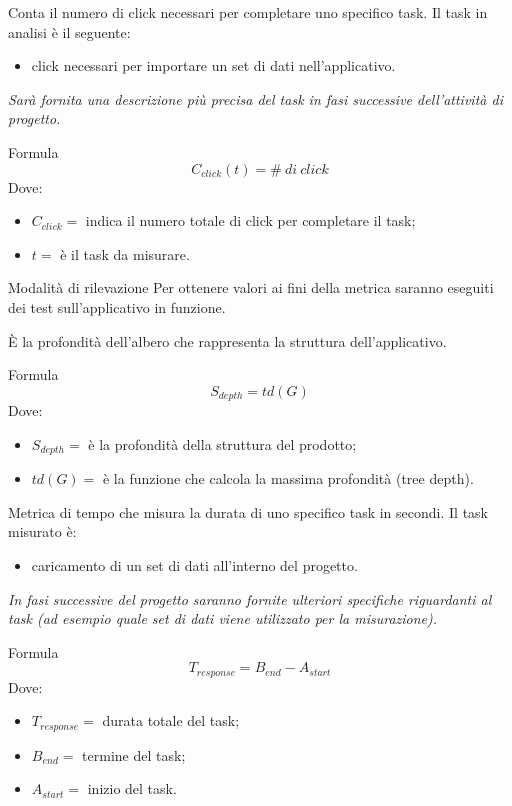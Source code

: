 Conta il numero di click necessari per completare uno specifico task. Il task 
in analisi è il seguente: 
\begin{itemize}
  \item click necessari per importare un set di dati nell'applicativo.
\end{itemize}
\textit{Sarà fornita una descrizione più precisa del task in fasi successive 
dell'attività di progetto.}
\par{Formula}
\begin{displaymath}
  C_{click}(t) = \#\ di\ click
\end{displaymath}
Dove:
\begin{itemize}
  \item[] $C_{click} =$ indica il numero totale di click per completare il 
task; 
  \item[] $t =$ è il task da misurare.
\end{itemize}
\par{Modalità di rilevazione}
Per ottenere valori ai fini della metrica saranno eseguiti dei test 
sull'applicativo in funzione.

È la profondità dell'albero che rappresenta la struttura dell'applicativo.
\par{Formula}
\begin{displaymath}
  S_{depth} = td(G)
\end{displaymath}
Dove:
\begin{itemize}
  \item[] $S_{depth} =$ è la profondità della struttura del prodotto;
  \item[] $td(G) =$ è la funzione che calcola la massima profondità (tree 
depth).
\end{itemize}

Metrica di tempo che misura la durata di uno specifico task in secondi. Il 
task misurato è:
\begin{itemize}
  \item caricamento di un set di dati all'interno del progetto.
\end{itemize}
\textit{In fasi successive del progetto saranno fornite ulteriori specifiche 
riguardanti al task (ad esempio quale set di dati viene utilizzato per la 
misurazione).}
\par{Formula}
\begin{displaymath}
  T_{response} = B_{end}-A_{start}
\end{displaymath}
Dove:
\begin{itemize}
  \item[] $T_{response} =$ durata totale del task;
  \item[] $B_{end} =$ termine del task;
  \item[] $A_{start} =$ inizio del task.
\end{itemize}

